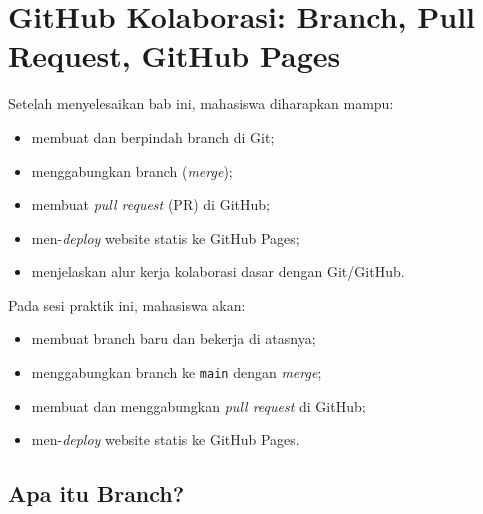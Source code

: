 
\chapter{GitHub Kolaborasi: Branch, Pull Request, GitHub Pages}
\label{chap:github-kolaborasi}

\begin{capaian}
Setelah menyelesaikan bab ini, mahasiswa diharapkan mampu:
\begin{itemize}
  \item membuat dan berpindah branch di Git;
  \item menggabungkan branch (\emph{merge});
  \item membuat \emph{pull request} (PR) di GitHub;
  \item men-\emph{deploy} website statis ke GitHub Pages;
  \item menjelaskan alur kerja kolaborasi dasar dengan Git/GitHub.
\end{itemize}
\end{capaian}

\begin{tujuanpraktik}
Pada sesi praktik ini, mahasiswa akan:
\begin{itemize}
  \item membuat branch baru dan bekerja di atasnya;
  \item menggabungkan branch ke \texttt{main} dengan \emph{merge};
  \item membuat dan menggabungkan \emph{pull request} di GitHub;
  \item men-\emph{deploy} website statis ke GitHub Pages.
\end{itemize}
\end{tujuanpraktik}

\section{Apa itu Branch?}
\label{sec:apa-itu-branch}

